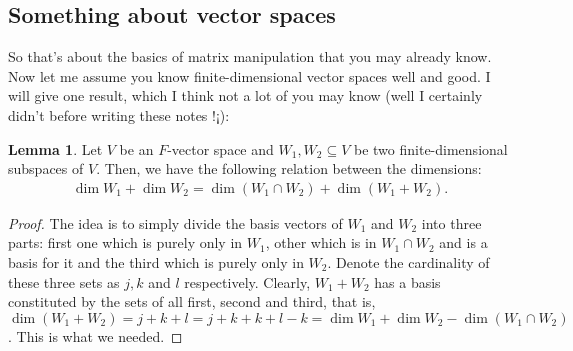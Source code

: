 \documentclass[letterpaper,11pt,twoside]{article}
\theoremstyle{definition}
\theoremstyle{definition}
\theoremstyle{definition}
\theoremstyle{definition}
\newtheorem{lemma}[proposition]{\textbf{Lemma}}
\theoremstyle{definition}
\theoremstyle{definition}
\theoremstyle{remark}
\theoremstyle{definition}
\begin{document}
	\subsection{Something about vector spaces}
	So that's about the basics of matrix manipulation that you may already know. Now let me assume you know finite-dimensional vector spaces well and good. I will give one result, which I think not a lot of you may know (well I certainly didn't before writing these notes !¡):
	\begin{lemma}
	Let $V$ be an $F$-vector space and $W_1, W_2\subseteq V$ be two finite-dimensional subspaces of $V$. Then, we have the following relation between the dimensions:
	\begin{align*}
	    \dim W_1 + \dim W_2 = \dim (W_1 \cap W_2 ) + \dim (W_1 + W_2).
	\end{align*}
	\end{lemma}
	\begin{proof}
        The idea is to simply divide the basis vectors of $W_1$ and $W_2$ into three parts: first one which is purely only in $W_1$, other which is in $W_1\cap W_2$ and is a basis for it and the third which is purely only in $W_2$. Denote the cardinality of these three sets as $j,k$ and $l$ respectively. Clearly, $W_1 + W_2$ has a basis constituted by the sets of all first, second and third, that is, $\dim (W_1+W_2) = j+k+l = j+k+k+l - k = \dim W_1 + \dim W_2 - \dim (W_1\cap W_2)$. This is what we needed. 
	\end{proof}
\end{document}
